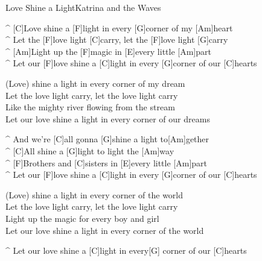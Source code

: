 \begin{song}{Love Shine a Light}{Katrina and the Waves}

\begin{guitar}
^ [C]Love shine a [F]light in every [G]corner of my [Am]heart\\
^ Let the [F]love light [C]carry, let the [F]love light [G]carry\\
^ [Am]Light up the [F]magic in [E]every little [Am]part\\
^ Let our [F]love shine a [C]light in every [G]corner of our [C]hearts\\
\end{guitar}

\begin{guitar}
(Love) shine a light in every corner of my dream\\
Let the love light carry, let the love light carry\\
Like the mighty river flowing from the stream\\
Let our love shine a light in every corner of our dreams\\
\end{guitar}


\begin{guitar}
^ And we're [C]all gonna [G]shine a light to[Am]gether\\
^ [C]All shine a [G]light to light the [Am]way\\
^ [F]Brothers and [C]sisters in [E]every little [Am]part\\
^ Let our [F]love shine a [C]light in every [G]corner of our [C]hearts\\
\end{guitar}



\begin{guitar}
(Love) shine a light in every corner of the world\\
Let the love light carry, let the love light carry\\
Light up the magic for every boy and girl\\
Let our love shine a light in every corner of the world\\
\end{guitar}





\begin{guitar}
^ Let our love shine a [C]light in every[G] corner of our [C]hearts\\
\end{guitar}
\end{song}

